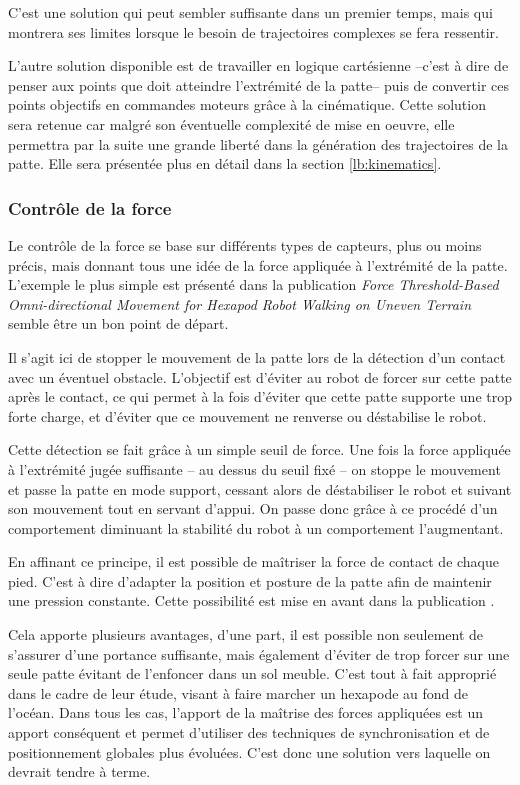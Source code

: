 \documentclass{tnreport}
\begin{document}
C'est une solution qui peut sembler suffisante dans un premier temps, mais qui montrera ses limites lorsque le besoin de trajectoires complexes se fera ressentir. 

L'autre solution disponible est de travailler en logique cartésienne --c'est à dire de penser aux points que doit atteindre l'extrémité de la patte-- puis de convertir ces points objectifs en commandes moteurs grâce à la cinématique. Cette solution sera retenue car malgré son éventuelle complexité de mise en oeuvre, elle permettra par la suite une grande liberté dans la génération des trajectoires de la patte. Elle sera présentée plus en détail dans la section \ref{lb:kinematics}. 

\newpage
\subsubsection{Contrôle de la force}\label{lb:ctrlforce}

Le contrôle de la force se base sur différents types de capteurs, plus ou moins précis, mais donnant tous une idée de la force appliquée à l'extrémité de la patte. L'exemple le plus simple est présenté dans la publication \textit{Force Threshold-Based Omni-directional Movement for Hexapod Robot Walking on Uneven Terrain}\cite{irawan_force_2012} semble être un bon point de départ. 

Il s'agit ici de stopper le mouvement de la patte lors de la détection d'un contact avec un éventuel obstacle. L'objectif est d'éviter au robot de forcer sur cette patte après le contact, ce qui permet à la fois d'éviter que cette patte supporte une trop forte charge, et d'éviter que ce mouvement ne renverse ou déstabilise le robot. 

Cette détection se fait grâce à un simple seuil de force. Une fois la force appliquée à l'extrémité jugée suffisante -- au dessus du seuil fixé -- on stoppe le mouvement et passe la patte en mode support, cessant alors de déstabiliser le robot et suivant son mouvement tout en servant d'appui. On passe donc grâce à ce procédé d'un comportement diminuant la stabilité du robot à un comportement l'augmentant. 

En affinant ce principe, il est possible de maîtriser la force de contact de chaque pied. C'est à dire d'adapter la position et posture de la patte afin de maintenir une pression constante. Cette possibilité est mise en avant dans la publication \cite{irawana_adaptive_2014}. 

Cela apporte plusieurs avantages, d'une part, il est possible non seulement de s'assurer d'une portance suffisante, mais également d'éviter de trop forcer sur une seule patte évitant de l'enfoncer dans un sol meuble. C'est tout à fait approprié dans le cadre de leur étude, visant à faire marcher un hexapode au fond de l'océan. Dans tous les cas, l'apport de la maîtrise des forces appliquées est un apport conséquent et permet d'utiliser des techniques de synchronisation et de positionnement globales plus évoluées. C'est donc une solution vers laquelle on devrait tendre à terme. 
\end{document}
